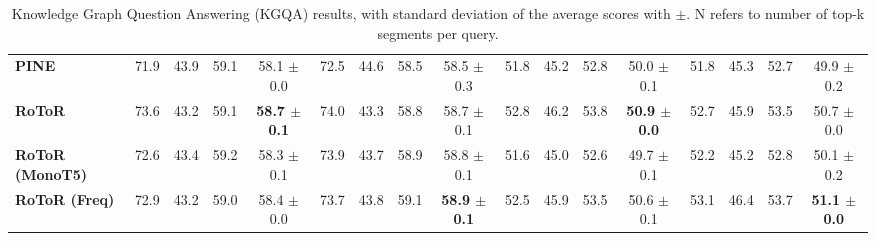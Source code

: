 \begin{table*}[t]
{\begin{tabular}{@{}lcccccccccccccccc@{}}
\multicolumn{1}{l|}{\textbf{PINE}} & 71.9 & 43.9 & 59.1 & \multicolumn{1}{c|}{58.1 \tiny{$\pm$ 0.0}} & 72.5 & 44.6 & 58.5 & \multicolumn{1}{c|}{58.5 \tiny{$\pm$ 0.3}} & 51.8 & 45.2 & 52.8 & \multicolumn{1}{c|}{50.0 \tiny{$\pm$ 0.1}} & 51.8 & 45.3 & 52.7 & 49.9 \tiny{$\pm$ 0.2} \\
\multicolumn{1}{l|}{\textbf{RoToR}} & 73.6 & 43.2 & 59.1 & \multicolumn{1}{c|}{\textbf{58.7 \tiny{$\pm$ 0.1}}} & 74.0 & 43.3 & 58.8 & \multicolumn{1}{c|}{58.7 \tiny{$\pm$ 0.1}} & 52.8 & 46.2 & 53.8 & \multicolumn{1}{c|}{\textbf{50.9 \tiny{$\pm$ 0.0}}} & 52.7 & 45.9 & 53.5 & 50.7 \tiny{$\pm$ 0.0} \\
\multicolumn{1}{l|}{\textbf{RoToR (MonoT5)}} & 72.6 & 43.4 & 59.2 & \multicolumn{1}{c|}{58.3 \tiny{$\pm$ 0.1}} & 73.9 & 43.7 & 58.9 & \multicolumn{1}{c|}{58.8 \tiny{$\pm$ 0.1}} & 51.6 & 45.0 & 52.6 & \multicolumn{1}{c|}{49.7 \tiny{$\pm$ 0.1}} & 52.2 & 45.2 & 52.8 & 50.1 \tiny{$\pm$ 0.2} \\
\multicolumn{1}{l|}{\textbf{RoToR (Freq)}} & 72.9 & 43.2 & 59.0 & \multicolumn{1}{c|}{58.4 \tiny{$\pm$ 0.0}} & 73.7 & 43.8 & 59.1 & \multicolumn{1}{c|}{\textbf{58.9 \tiny{$\pm$ 0.1}}} & 52.5 & 45.9 & 53.5 & \multicolumn{1}{c|}{50.6 \tiny{$\pm$ 0.1}} & 53.1 & 46.4 & 53.7 & \textbf{51.1 \tiny{$\pm$ 0.0}} \\ \bottomrule
\end{tabular}
}
\caption{Knowledge Graph Question Answering (KGQA) results, with standard deviation of the average scores with $\pm$. N refers to number of top-k segments per query.}
\label{table/kgqa}

\end{table*}
